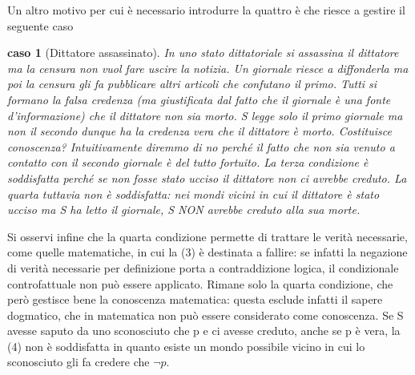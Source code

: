 \documentclass[10pt,a4paper]{article}
\newtheorem{caso}{caso}
\begin{document}
Un altro motivo per cui è necessario introdurre la quattro è che riesce a gestire il seguente caso
\begin{caso}[Dittatore assassinato]
	In uno stato dittatoriale si assassina il dittatore ma la censura non vuol fare uscire la notizia. Un giornale riesce a diffonderla ma poi la censura gli fa pubblicare altri articoli che confutano il primo. Tutti si formano la falsa credenza (ma giustificata dal fatto che il giornale è una fonte d'informazione) che il dittatore non sia morto. S legge solo il primo giornale ma non il secondo dunque ha la credenza vera che il dittatore è morto. Costituisce conoscenza? Intuitivamente diremmo di no perché il fatto che non sia venuto a contatto con il secondo giornale è del tutto fortuito. La terza condizione è soddisfatta perché se non fosse stato ucciso il dittatore non ci avrebbe creduto. La quarta tuttavia non è soddisfatta: nei mondi vicini in cui il dittatore è stato ucciso ma S ha letto il giornale, S NON avrebbe creduto alla sua morte. 
\end{caso}
Si osservi infine che la quarta condizione permette di trattare le verità necessarie, come quelle matematiche, in cui la (3) è destinata a fallire: se infatti la negazione di verità necessarie per definizione porta a contraddizione logica, il condizionale controfattuale non può essere applicato. Rimane solo la quarta condizione, che però gestisce bene la conoscenza matematica: questa esclude infatti il sapere dogmatico, che in matematica non può essere considerato come conoscenza. Se S avesse saputo da uno sconosciuto che p e ci avesse creduto, anche se p è vera, la (4) non è soddisfatta in quanto esiste un mondo possibile vicino in cui lo sconosciuto gli fa credere che \(\neg p\).\\ 
 
\end{document}
